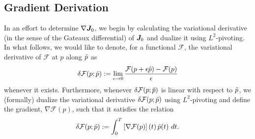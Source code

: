 \subsection{Gradient Derivation}
In an effort to determine $\nabla \bm{J}_0$, we begin by calculating the variational derivative (in the sense of the Gateaux differential) of $\bm{J}_0$ and dualize it using $L^2$-pivoting.
In what follows, we would like to denote, for a functional $\mathcal{F}$, the variational derivative of $\mathcal{F}$ at $p$ along $\tilde{p}$ as 
\begin{equation}\label{definition}
    \delta \mathcal{F}(p;\tilde{p}) := \lim_{\epsilon \rightarrow 0} \frac{\mathcal{F}(p+\epsilon \tilde{p}) - \mathcal{F}(p)}{\epsilon} 
\end{equation}
whenever it exists.  Furthermore, whenever $\delta \mathcal{F}(p;\tilde{p})$ is linear with respect to $\tilde{p}$, we (formally) dualize the variational derivative $\delta \mathcal{F}(p;\tilde{p})$ using $L^2$-pivoting and define the gradient, $\nabla \mathcal{F}(p)$, such that it satisfies the relation
\begin{equation}\label{grad_def}
    \delta \mathcal{F} (p;\tilde{p}) := \int_{0}^{T} \left[\nabla \mathcal{F}(p)\right](t) \, \tilde{p} (t)\ dt.
\end{equation}


